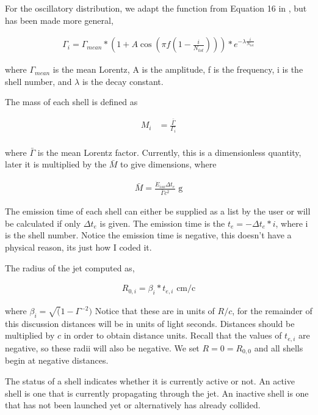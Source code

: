 \documentclass[linenumbers,twocolumn]{aastex631}
\begin{document}
 For the oscillatory distribution, we adapt the function from Equation 16 in \citet{2013A&A...551A.124H}, but has been made more general,

 \begin{align}
	\Gamma_i = \Gamma_{mean} * \left(1+A\cos\left(\pi f\left(1-\frac{i}{N_{tot}}\right)\right)\right)*e^{-\lambda \frac{i}{N_{tot}}} 
 \end{align}

where $\Gamma_{mean}$ is the mean Lorentz, A is the amplitude, f is the frequency, i is the shell number, and $\lambda$ is the decay constant.

The mass of each shell is defined as

\begin{align}
	M_i &= \frac{\bar{\Gamma}}{\Gamma_i} \\ 
\end{align}

where $\bar{\Gamma}$ is the mean Lorentz factor. Currently, this is a dimensionless quantity, later it is multiplied by the $\bar{M}$ to give dimensions, where

\begin{align}
\bar{M} = \frac{\dot{E}_{iso} \Delta t_e}{\bar{\Gamma}c^2} \text{ g}
\end{align}

The emission time of each shell can either be supplied as a list by the user or will be calculated if only $\Delta t_e$ is given. The emission time is the $t_e = -\Delta t_e * i$, where i is the shell number. Notice the emission time is negative, this doesn't have a physical reason, its just how I coded it. 

The radius of the jet computed as,

\begin{align}
	R_{0,i} = \beta_i * t_{e,i}\text{ cm/c}
\end{align}

where $\beta_i = \sqrt(1 - \Gamma^{-2})$ Notice that these are in units of $R/c$, for the remainder of this discussion distances will be in units of light seconds. Distances should be multiplied by $c$ in order to obtain distance units. Recall that the values of $t_{e,i}$ are negative, so these radii will also be negative. We set $R = 0 = R_{0,0}$ and all shells begin at negative distances.

The status of a shell indicates whether it is currently active or not. An active shell is one that is currently propagating through the jet. An inactive shell is one that has not been launched yet or alternatively has already collided. 
\end{document}
